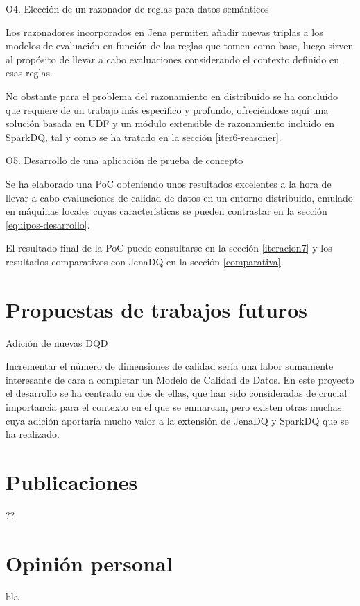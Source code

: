 \begin{definitionlist}
\item [O4. Elección de un razonador de reglas para datos semánticos]

Los razonadores incorporados en Jena permiten añadir nuevas triplas a los
modelos de evaluación en función de las reglas que tomen como base, luego sirven
al propósito de llevar a cabo evaluaciones considerando el contexto definido en
esas reglas. 

No obstante para el problema del razonamiento en distribuido se ha concluído que
requiere de un trabajo más específico y profundo, ofreciéndose aquí una solución
basada en \acf{UDF} y un módulo extensible de razonamiento incluido en SparkDQ,
tal y como se ha tratado en la sección \ref{iter6-reasoner}. 

\item [O5. Desarrollo de una aplicación de prueba de concepto]

Se ha elaborado una \acs{PoC} obteniendo unos resultados excelentes a la hora de
llevar a cabo evaluaciones de calidad de datos en un entorno distribuido,
emulado en máquinas locales cuyas características se pueden contrastar en la
sección \ref{equipos-desarrollo}.

El resultado final de la \acs{PoC} puede consultarse en la sección \ref{iteracion7} y los resultados
comparativos con JenaDQ en la sección \ref{comparativa}. 

\end{definitionlist}

\section{Propuestas de trabajos futuros}


\begin{definitionlist}

\item[Adición de nuevas \acs{DQD}]

Incrementar el número de dimensiones de calidad sería una labor sumamente
interesante de cara a completar un Modelo de Calidad de Datos. En este proyecto
el desarrollo se ha centrado en dos de ellas, que han sido consideradas de
crucial importancia para el contexto en el que se enmarcan, pero existen otras
muchas cuya adición aportaría mucho valor a la extensión de JenaDQ y SparkDQ que se ha
realizado. 
  

\end{definitionlist}

\section{Publicaciones}
??
\section{Opinión personal}
bla
